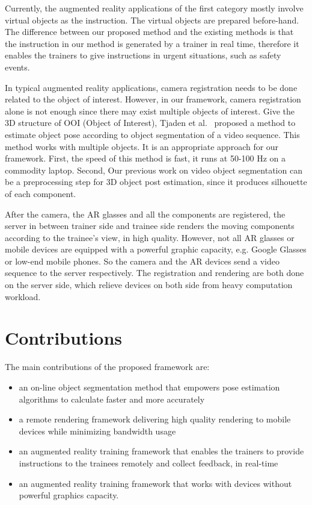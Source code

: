 Currently, the augmented reality applications of the first category mostly involve virtual objects as the instruction. The virtual objects are prepared before-hand.
The difference between our proposed method and the existing methods is that the instruction in our method is generated by a trainer in real time, therefore it enables the trainers to give instructions in urgent situations, such as safety events.

In typical augmented reality applications, camera registration needs to be done related to the object of interest. However, in our framework, camera registration alone is not enough since there may exist multiple objects of interest.
Give the 3D structure of OOI (Object of Interest), Tjaden et al.~\cite{tjaden2016} proposed a method to estimate object pose according to object segmentation of a video sequence. This method works with multiple objects.
It is an appropriate approach for our framework. First, the speed of this method is fast, it runs at 50-100 Hz on a commodity laptop. Second, Our previous work on video object segmentation can be a preprocessing step for 3D object post estimation, since it produces silhouette of each component.

After the camera, the AR glasses and all the components are registered, the server in between trainer side and trainee side renders the moving components according to the trainee's view, in high quality.
However, not all AR glasses or mobile devices are equipped with a powerful graphic capacity, e.g. Google Glasses or low-end mobile phones.
So the camera and the AR devices send a video sequence to the server respectively. The registration and rendering are both done on the server side, which relieve devices on both side from heavy computation workload.

\section{Contributions}

The main contributions of the proposed framework are:

\begin{itemize}
  \item
  an on-line object segmentation method that empowers pose estimation algorithms to calculate faster and more accurately
  \item
  a remote rendering framework delivering high quality rendering to mobile devices while minimizing bandwidth usage
  \item
  an augmented reality training framework that enables the trainers to provide instructions to the trainees remotely and collect feedback, in real-time
  \item
  an augmented reality training framework that works with devices without powerful graphics capacity.
\end{itemize}

